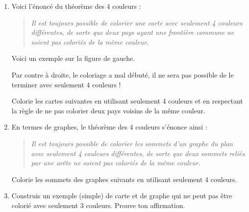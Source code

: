 \documentclass[class=report,crop=false, 12pt]{standalone}
\begin{document}
\begin{activite}
\begin{enumerate}
 
  \item Voici l'énoncé du théorème des 4 couleurs : 
  \begin{quote}
  \emph{Il est toujours possible de colorier une carte avec seulement 4 couleurs différentes, de sorte que deux pays ayant une frontière commune ne soient pas coloriés de la même couleur.}
  \end{quote}
  
  Voici un exemple sur la figure de gauche. 

  Par contre à droite, le coloriage a mal débuté, il ne sera pas possible de le terminer avec seulement 4 couleurs !
  
  
  Colorie les cartes suivantes en utilisant seulement 4 couleurs et en respectant la règle de ne pas colorier deux pays voisins de la même couleur.
  
 
  
  
  \item En termes de graphes, le théorème des 4 couleurs s'énonce ainsi : 
  \begin{quote}
  \emph{Il est toujours possible de colorier les sommets d'un graphe du plan avec seulement 4 couleurs différentes, de sorte que deux sommets reliés par une arête ne soient pas coloriés de la même couleur.}
  \end{quote}    
 
  Colorie les sommets des graphes suivants en utilisant seulement 4 couleurs.
  
  \item Construis un exemple (simple) de carte et de graphe qui ne peut pas être colorié avec seulement 3 couleurs. Prouve ton affirmation.
\end{enumerate}
    

   
\end{activite}
\end{document}
